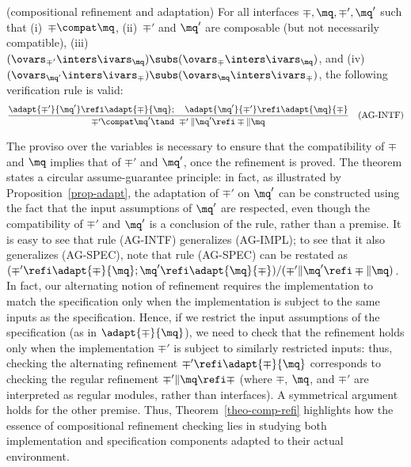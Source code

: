 \begin{theo}{(compositional refinement and adaptation)} 
\label{theo-comp-refi} 
For all interfaces $\mp, \mq, \mp', \mq'$ such that 
(i)~$\mp \compat \mq$, 
(ii)~$\mp'$ and $\mq'$ are composable (but not necessarily
compatible),
(iii)~$(\ovars_{\mp'} \inters \ivars_\mq) \subs (\ovars_\mp \inters \ivars_\mq)$,
and 
(iv)~$(\ovars_{\mq'} \inters \ivars_\mp) \subs (\ovars_\mq \inters \ivars_\mp)$,
the following verification rule is valid: 
\[
  \frac{\adapt{\mp'}{\mq'} \refi \adapt{\mp}{\mq}; \hspace{1em} 
        \adapt{\mq'}{\mp'} \refi \adapt{\mq}{\mp}}{
	\mp' \compat \mq' \tand \ 
	\mp' \| \mq' \refi \mp \| \mq} \hspace{1em} (\mbox{\rm AG-INTF})
\]
\end{theo}

\noindent
The proviso over the variables is necessary to ensure that the
compatibility of $\mp$ and $\mq$ implies that of $\mp'$ and $\mq'$,
once the refinement is proved. 
The theorem states a circular assume-guarantee principle: in fact, 
as illustrated by Proposition~\ref{prop-adapt}, the adaptation of
$\mp'$ on $\mq'$ can be constructed using the fact that the input
assumptions of $\mq'$ are respected, even though the compatibility of
$\mp'$ and $\mq'$ is a conclusion of the rule, rather than a premise. 
It is easy to see that rule (AG-INTF) generalizes (AG-IMPL); to see
that it also generalizes (AG-SPEC), 
note that rule (AG-SPEC) can be restated as 
$(\mp' \refi \adapt{\mp}{\mq}; \mq' \refi \adapt{\mq}{\mp})/
(\mp' \| \mq' \refi \mp \| \mq)$. 
In fact, our alternating notion of refinement requires the
implementation to match the specification only when the implementation
is subject to the same inputs as the specification. 
Hence, if we restrict the input assumptions of the specification (as
in $\adapt{\mp}{\mq}$), we need to check that the refinement holds only
when the implementation $\mp'$ is subject to similarly restricted
inputs: thus, checking the alternating refinement 
$\mp' \refi \adapt{\mp}{\mq}$ corresponds to checking the regular
refinement $\mp' \| \mq \refi \mp$ (where $\mp$, $\mq$, and $\mp'$ are
interpreted as regular modules, rather than interfaces). 
A symmetrical argument holds for the other premise. 
Thus, Theorem~\ref{theo-comp-refi} highlights how the essence of
compositional refinement checking lies in studying both implementation
and specification components adapted to their actual environment. 





